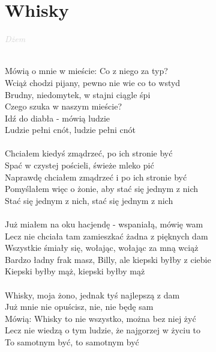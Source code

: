 \documentclass[a5paper, 10pt]{book}
\begin{document}
\newpage
\section{Whisky}\textcolor{lightgray}{\textit{Dżem}}\\~\\
\begin{minipage}[t]{0.8\textwidth}
Mówią o mnie w mieście: Co z niego za typ?\\
Wciąż chodzi pijany, pewno nie wie co to wstyd\\
Brudny, niedomytek, w stajni ciągle śpi\\
Czego szuka w naszym mieście?\\
Idź do diabła - mówią ludzie\\
Ludzie pełni cnót, ludzie pełni cnót\\
\\
Chciałem kiedyś zmądrzeć, po ich stronie być\\
Spać w czystej pościeli, świeże mleko pić\\
Naprawdę chciałem zmądrzeć i po ich stronie być\\
Pomyślałem więc o żonie, aby stać się jednym z nich\\
Stać się jednym z nich, stać się jednym z nich\\
\\
Już miałem na oku hacjendę - wspaniałą, mówię wam\\
Lecz nie chciała tam zamieszkać żadna z pięknych dam\\
Wszystkie śmiały się, wołając, wołając za mną wciąż\\
Bardzo ładny frak masz, Billy, ale kiepski byłby z ciebie\\
Kiepski byłby mąż, kiepski byłby mąż\\
\\
Whisky, moja żono, jednak tyś najlepszą z dam\\
Już mnie nie opuścisz, nie, nie będę sam\\
Mówią: Whisky to nie wszystko, można bez niej żyć\\
Lecz nie wiedzą o tym ludzie, że najgorzej w życiu to\\
To samotnym być, to samotnym być\\
\end{minipage}
\end{document}
